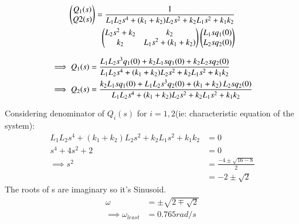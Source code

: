 \documentclass[journal,12pt,twocolumn]{IEEEtran}
\theoremstyle{remark}
\begin{document}
\begin{align}
\begin{pmatrix}
Q_1(s) \\
Q2(s)
\end{pmatrix}
= \frac{1}{L_1L_2s^4+(k_1+k_2)L_2s^2+k_2L_1s^2+k_1k_2} \nonumber \\
\begin{pmatrix}
L_2s^2+k_2 & k_2  \\
k_2& L_1s^2 + \left(k_1+k_2\right)
\end{pmatrix}
\begin{pmatrix}
L_1sq_1(0) \\
L_2sq_2(0)
\end{pmatrix}
\end{align}

\begin{align}
\implies Q_1(s)&=\frac{L_1L_2s^3q_1(0)+k_2L_1sq_1(0)+k_2L_2sq_2(0)}{L_1L_2s^4+(k_1+k_2)L_2s^2+k_2L_1s^2+k_1k_2} \\
\implies Q_2(s)&= \frac{k_2L_1sq_1(0)+L_1L_2s^3q_2(0)+\left(k_1+k_2\right)L_2sq_2(0)}{L_1L_2s^4+(k_1+k_2)L_2s^2+k_2L_1s^2+k_1k_2} 
\end{align}

Considering denominator of $Q_i(s)$ for $i=1,2$(ie: characteristic equation of the system):
\begin{align}
L_1L_2s^4+(k_1+k_2)L_2s^2+k_2L_1s^2+k_1k_2 &=0 \\
s^4 +4s^2+2&=0\\
\implies s^2&=\frac{-4\pm \sqrt{16-8}}{2} \\
&= -2 \pm \sqrt{2} 
\end{align}
The roots of s are imaginary so it's Sinusoid.
\begin{align}
\omega&=\pm\sqrt{2\mp \sqrt{2}}\\
\implies \omega_{least} &= 0.765 rad/s
\end{align} 
\end{document}
